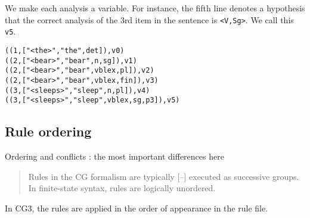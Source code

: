 \documentclass[11pt]{article}
\begin{document}
We make each analysis a variable. For instance, the fifth line denotes
a hypothesis that the correct analysis of the 3rd item in the sentence
is \texttt{<V,Sg>}. We call this \texttt{v5}.

\begin{lstlisting}
((1,["<the>","the",det]),v0)
((2,["<bear>","bear",n,sg]),v1)
((2,["<bear>","bear",vblex,pl]),v2)
((2,["<bear>","bear",vblex,fin]),v3)
((3,["<sleeps>","sleep",n,pl]),v4)
((3,["<sleeps>","sleep",vblex,sg,p3]),v5)
\end{lstlisting}

\subsection{Rule ordering}
\label{ssec:ordering}

Ordering and conflicts : the most important differences here

\cite{koskenniemi92}
\begin{quote}Rules in the CG formalism are typically [--] executed as successive groups.
In finite-state syntax, rules are logically unordered.\end{quote}


In CG3, the rules are applied in the order of appearance in the rule file.








\end{document}
